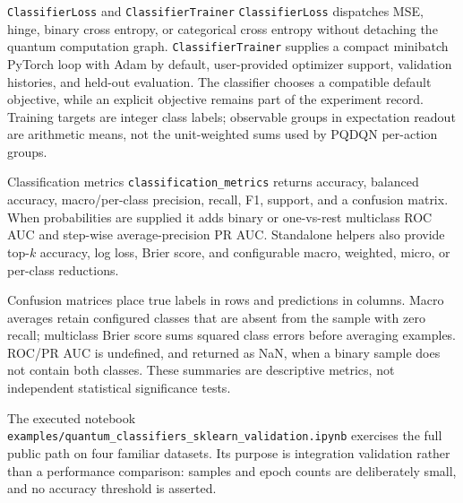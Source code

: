 \documentclass[10pt]{article}
\newcommand{\code}[1]{\texttt{#1}}
\begin{document}
\begin{qaspfeature}{\code{ClassifierLoss} and \code{ClassifierTrainer}}
\code{ClassifierLoss} dispatches MSE, hinge, binary cross entropy, or
categorical cross entropy without detaching the quantum computation graph.
\code{ClassifierTrainer} supplies a compact minibatch PyTorch loop with Adam
by default, user-provided optimizer support, validation histories, and held-out
evaluation.  The classifier chooses a compatible default objective, while an
explicit objective remains part of the experiment record.  Training targets
are integer class labels; observable groups in expectation readout are
arithmetic means, not the unit-weighted sums used by PQDQN per-action groups.
\end{qaspfeature}

\begin{qaspfeature}{Classification metrics}
\code{classification\_metrics} returns accuracy, balanced accuracy,
macro/per-class precision, recall, F1, support, and a confusion matrix.  When
probabilities are supplied it adds binary or one-vs-rest multiclass ROC AUC and
step-wise average-precision PR AUC.  Standalone helpers also provide top-$k$
accuracy, log loss, Brier score, and configurable macro, weighted, micro, or
per-class reductions.
\end{qaspfeature}

Confusion matrices place true labels in rows and predictions in columns.
Macro averages retain configured classes that are absent from the sample with
zero recall; multiclass Brier score sums squared class errors before averaging
examples.  ROC/PR AUC is undefined, and returned as NaN, when a binary sample
does not contain both classes.  These summaries are descriptive metrics, not
independent statistical significance tests.

The executed notebook
\code{examples/quantum\_classifiers\_sklearn\_validation.ipynb} exercises the
full public path on four familiar datasets.  Its purpose is integration
validation rather than a performance comparison: samples and epoch counts are
deliberately small, and no accuracy threshold is asserted.
\end{document}
